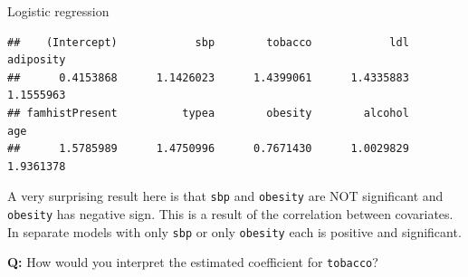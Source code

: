 \documentclass[
  ignorenonframetext,
]{beamer}
\begin{document}
\begin{frame}[fragile]
\begin{block}{Logistic regression}
\begin{verbatim}
##    (Intercept)            sbp        tobacco            ldl      adiposity 
##      0.4153868      1.1426023      1.4399061      1.4335883      1.1555963 
## famhistPresent          typea        obesity        alcohol            age 
##      1.5785989      1.4750996      0.7671430      1.0029829      1.9361378
\end{verbatim}

A very surprising result here is that \texttt{sbp} and \texttt{obesity}
are NOT significant and \texttt{obesity} has negative sign. This is a
result of the correlation between covariates. In separate models with
only \texttt{sbp} or only \texttt{obesity} each is positive and
significant.

\textbf{Q:} How would you interpret the estimated coefficient for
\texttt{tobacco}?

\end{block}

\end{frame}
\end{document}
